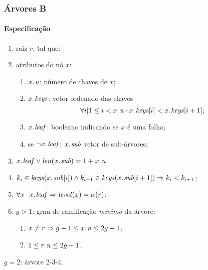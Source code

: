 \documentclass{beamer}
\begin{document}
\begin{frame}

\frametitle{Árvores B}
\framesubtitle{Especificação}

  \begin{enumerate}
  \item raiz $r$, tal que:
  \item atributos do nó $x$:
    \begin{enumerate}
    \item $\attrib{x}{n}$: número de chaves de $x$;
    \item $\attrib{x}{keys}$: vetor ordenado das chaves
      $$\forall i | 1 \leq i < \attrib{x}{n} \cdot \attrib{x}{keys}[i] < \attrib{x}{keys}[i+1];$$
    \item $\attrib{x}{leaf}$: booleano indicando se $x$ é uma folha;
    \item se $\neg \attrib{x}{leaf}$: $\attrib{x}{sub}$ vetor de sub-árvores;
    \end{enumerate}
  \item $\attrib{x}{leaf} \lor \id{len}(\attrib{x}{sub}) = 1 + \attrib{x}{n}$
  \item $k_i \in \id{keys}(\attrib{x}{sub}[i]) \land k_{i+1} \in \id{keys}(\attrib{x}{sub}[i+1]) \Rightarrow k_i < k_{i+1}$;
  \item $\forall x \cdot \attrib{x}{leaf} \Rightarrow \id{level}(x) = \alpha(r)$;
  \item $g > 1$: grau de ramificação \emph{mínimo} da árvore:
    \begin{enumerate}
    \item $x \neq r \Rightarrow g-1 \le \attrib{x}{n} \le 2g - 1$;
    \item $1 \le \attrib{r}{n} \le 2g - 1$,
    \end{enumerate}
  \end{enumerate}
  $g = 2$: árvore 2-3-4.

\end{frame}
\end{document}
